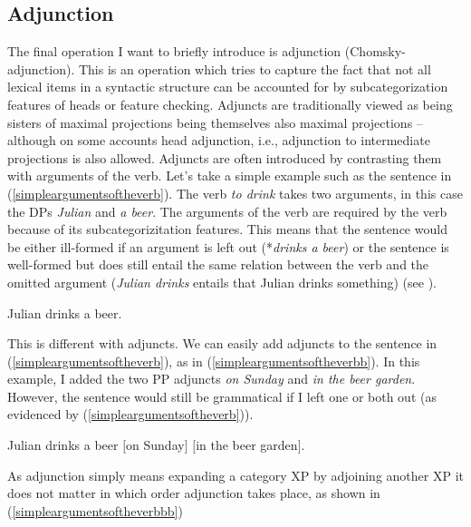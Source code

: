 \subsection{Adjunction}\label{generaladjunction}
The final operation I want to briefly introduce is adjunction (Chomsky-adjunction). This is an operation which tries to capture the fact that not all lexical items in a syntactic structure can be accounted for by subcategorization features of heads or feature checking. Adjuncts are traditionally viewed as being sisters of maximal projections being themselves also maximal projections -- although on some accounts head adjunction, i.e., adjunction to intermediate projections is also allowed. Adjuncts are often introduced by contrasting them with arguments of the verb. Let's take a simple example such as the sentence in (\ref{simpleargumentsoftheverb}). The verb \textit{to drink} takes two arguments, in this case the DPs \textit{Julian} and \textit{a beer}. The arguments of the verb are required by the verb because of its subcategorizitation features. This means that the sentence would be either ill-formed if an argument is left out (*\textit{drinks a beer}) or the sentence is well-formed but does still entail the same relation between the verb and the omitted argument (\textit{Julian drinks} entails that Julian drinks something) (see \citealt{hole2015arguments}).

\begin{exe}
\ex\label{simpleargumentsoftheverb} Julian drinks a beer.
\end{exe}

\noindent This is different with adjuncts. We can easily add adjuncts to the sentence in (\ref{simpleargumentsoftheverb}), as in (\ref{simpleargumentsoftheverbb}). In this example, I added the two PP adjuncts \textit{on Sunday} and \textit{in the beer garden}. However, the sentence would still be grammatical if I left one or both out (as evidenced by (\ref{simpleargumentsoftheverb})). 

\begin{exe}
\ex\label{simpleargumentsoftheverbb} Julian drinks a beer $[$on Sunday$]$ $[$in the beer garden$]$.
\end{exe}

\noindent As adjunction simply means expanding a category XP by adjoining another XP it does not matter in which order adjunction takes place, as shown in (\ref{simpleargumentsoftheverbbb})

